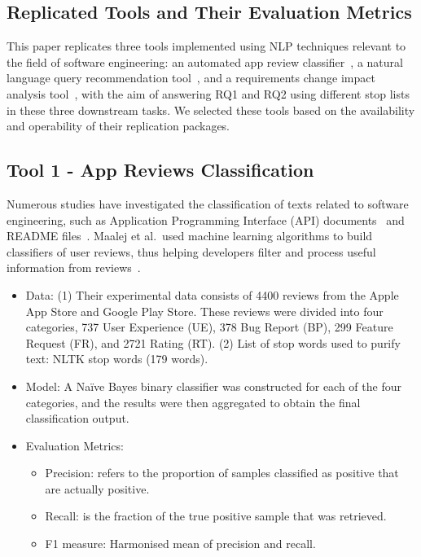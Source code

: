 \documentclass[conference]{IEEEtran}
\begin{document}
\begin{sloppy}
\section{Replicated Tools and Their Evaluation Metrics}

This paper replicates three tools implemented using NLP techniques relevant to the field of software engineering: an automated app review classifier~\cite{maalej2016automatic}, a natural language query recommendation tool~\cite{rahman2017rack}, and a requirements change impact analysis tool~\cite{arora2015change}, with the aim of answering RQ1 and RQ2 using different stop lists in these three downstream tasks. We selected these tools based on the availability and operability of their replication packages.

\subsection{Tool 1 - App Reviews Classification}

Numerous studies have investigated the classification of texts related to software engineering, such as Application Programming Interface (API) documents~\cite{petrosyan2015discovering} and README files~\cite{prana2019categorizing}. Maalej et al.~used machine learning algorithms to build classifiers of user reviews, thus helping developers filter and process useful information from reviews~\cite{maalej2016automatic}. 

\begin{itemize}
\item Data: (1) Their experimental data consists of 4400 reviews from the Apple App Store and Google Play Store. These reviews were divided into four categories, 737 User Experience (UE), 378 Bug Report (BP), 299 Feature Request (FR), and 2721 Rating (RT). (2) List of stop words used to purify text: NLTK stop words (179 words). 
\item Model: A Naïve Bayes binary classifier was constructed for each of the four categories, and the results were then aggregated to obtain the final classification output. 
\item Evaluation Metrics:
\begin{itemize}
\item Precision: refers to the proportion of samples classified as positive that are actually positive. 
\item Recall: is the fraction of the true positive sample that was retrieved. 
\item F1 measure: Harmonised mean of precision and recall. 
\end{itemize}
\end{itemize}


\end{sloppy}
\end{document}
